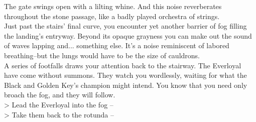 The gate swings open with a lilting whine. And this noise reverberates throughout the stone passage, like a badly played orchestra of strings.\\

Just past the stairs' final curve, you encounter yet another barrier of fog filling the landing's entryway. Beyond its opaque grayness you can make out the sound of waves lapping and... something else. It's a noise reminiscent of labored breathing--but the lungs would have to be the size of cauldrons.\\

A series of footfalls draws your attention back to the stairway. The Everloyal have come without summons. They watch you wordlessly, waiting for what the Black and Golden Key's champion might intend. You know that you need only broach the fog, and they will follow.\\

> Lead the Everloyal into the fog -- \\
> Take them back to the rotunda -- 